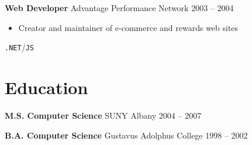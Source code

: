 \documentclass{res}
\begin{document}
        {\bf Web Developer} \hfill Advantage Performance Network \hfill 2003 -- 2004
        \begin{itemize}
        \item Creator and maintainer of e-commerce and rewards web sites
        \end{itemize}
        \texttt{.NET}\slash\texttt{JS}
        

\section{Education}
        {\bf M.S. Computer Science} \hfill SUNY Albany \hfill 2004 -- 2007
        
        {\bf B.A. Computer Science} \hfill Gustavus Adolphus College \hfill 1998 -- 2002
        
        
\end{document}
